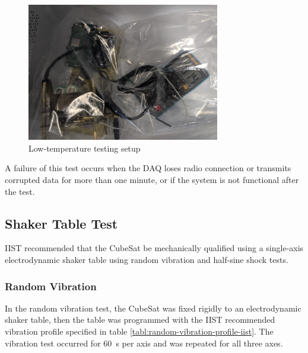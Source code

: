 \documentclass{report}
\begin{document}
\begin{figure}[H]
  \centering
  \includegraphics[width=0.75\textwidth]{images/fridge_test.jpg}
  \caption{Low-temperature testing setup}
\end{figure}

A failure of this test occurs when the DAQ loses radio connection or transmits corrupted data for more than one minute, or if the system is not functional after the test.

\subsection{Shaker Table Test}
\label{sec:shaker-table-test}

IIST recommended that the CubeSat be mechanically qualified using a single-axis electrodynamic shaker table using random vibration and half-sine shock tests.

\subsubsection{Random Vibration}

In the random vibration test, the CubeSat was fixed rigidly to an electrodynamic shaker table, then the table was programmed with the IIST recommended vibration profile specified in table \ref{tabl:random-vibration-profile-iist}. The vibration test occurred for \SI{60}{\second} per axis and was repeated for all three axes.
\end{document}
